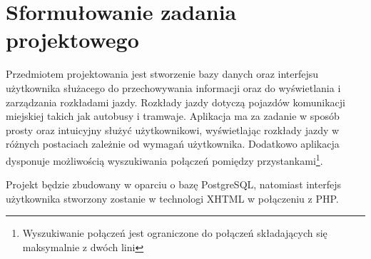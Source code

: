 \section{Sformułowanie zadania projektowego}


Przedmiotem projektowania jest stworzenie bazy danych oraz interfejsu użytkownika służacego do przechowywania informacji oraz do wyświetlania i zarządzania rozkładami jazdy. Rozkłady jazdy dotyczą pojazdów komunikacji miejskiej takich jak autobusy i tramwaje.
Aplikacja ma za zadanie w sposób prosty oraz intuicyjny służyć użytkownikowi, wyświetlając rozkłady jazdy w różnych postaciach zależnie od wymagań użytkownika. Dodatkowo aplikacja dysponuje możliwością wyszukiwania połączeń pomiędzy przystankami\footnote{Wyszukiwanie połączeń jest ograniczone do połączeń składających się maksymalnie z dwóch lini}.

Projekt będzie zbudowany w oparciu o bazę PostgreSQL, natomiast interfejs użytkownika stworzony zostanie w technologi XHTML w połączeniu z PHP.
